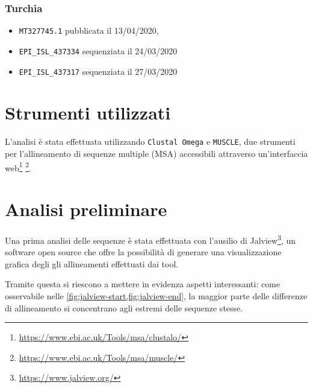 \documentclass[11pt,italian]{article}
\begin{document}
\subsubsection*{Turchia}
\begin{itemize}
    \item \lstinline{MT327745.1} pubblicata il 13/04/2020,
    \item \lstinline{EPI_ISL_437334} sequenziata il 24/03/2020
    \item \lstinline{EPI_ISL_437317} sequenziata il 27/03/2020
\end{itemize}

\section{Strumenti utilizzati}
L'analisi è stata effettuata utilizzando \lstinline{Clustal Omega} e \lstinline{MUSCLE}, due strumenti per l'allineamento di sequenze multiple (MSA) accessibili attraverso un'interfaccia web\footnote{\url{https://www.ebi.ac.uk/Tools/msa/clustalo/}} \footnote{\url{https://www.ebi.ac.uk/Tools/msa/muscle/}}.

\newpage
\section{Analisi preliminare}
Una prima analisi delle sequenze è stata effettuata con l'ausilio di Jalview\footnote{\url{https://www.jalview.org/}}, un software open source che offre la possibilità di generare una visualizzazione grafica degli gli allineamenti effettuati dai tool.

Tramite questa si riescono a mettere in evidenza aspetti interessanti: come osservabile nelle \cref{fig:jalview-start,fig:jalview-end}, la maggior parte delle differenze di allineamento si concentrano agli estremi delle sequenze stesse.
\end{document}
